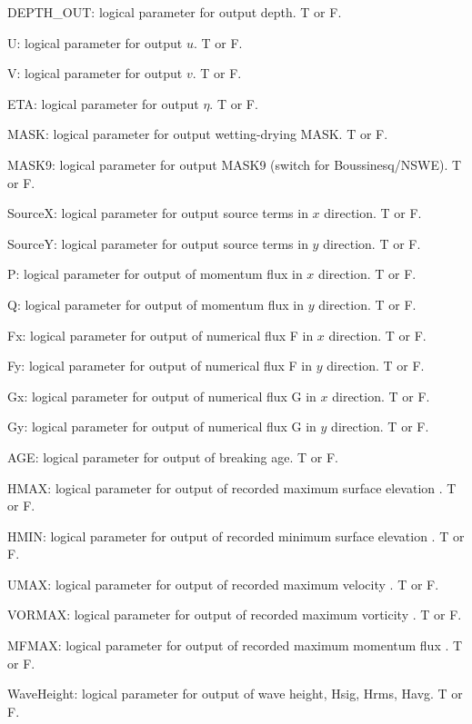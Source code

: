 \documentclass[11pt]{article}
\begin{document}
\begin{description}
\item DEPTH\_OUT: logical parameter for output depth. T or F. 
\item U: logical parameter for output $u$. T or F. 
\item  V: logical parameter for output $v$. T or F. 
\item ETA: logical parameter for output $\eta$. T or F. 
\item MASK: logical parameter for output wetting-drying MASK. T or F. 
\item MASK9: logical parameter for output MASK9 (switch for Boussinesq/NSWE). T or F. 
\item SourceX: logical parameter for output source terms in $x$ direction. T or F. 
\item SourceY:  logical parameter for output source terms in $y$ direction. T or F. 
\item P:   logical parameter for output of  momentum flux in $x$ direction. T or F. 
\item Q:  logical parameter for output of  momentum flux in $y$ direction. T or F. 
\item Fx: logical parameter for output of numerical flux F in $x$ direction. T or F. 
\item  Fy: logical parameter for output of numerical flux F in $y$ direction. T or F. 
\item Gx: logical parameter for output of numerical flux G in $x$ direction. T or F. 
\item Gy: logical parameter for output of numerical flux G in $y$ direction. T or F. 
\item AGE: logical parameter for output of breaking age. T or F. 
\item HMAX: logical parameter for output of recorded maximum surface elevation . T or F. 
\item HMIN: logical parameter for output of recorded minimum surface elevation . T or F. 
\item UMAX: logical parameter for output of recorded maximum velocity . T or F. 
\item VORMAX: logical parameter for output of recorded maximum vorticity . T or F. 
\item MFMAX: logical parameter for output of recorded maximum momentum flux . T or F. 
\item WaveHeight: logical parameter for output of wave height, Hsig, Hrms, Havg. T or F.


\end{description}
\end{document}
